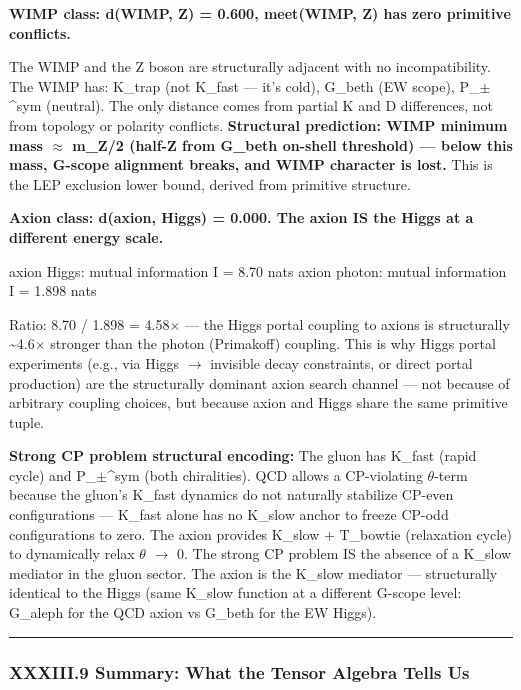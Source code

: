\documentclass[12pt,a4paper]{article}
\begin{document}
\textbf{WIMP class: d(WIMP, Z) = 0.600, meet(WIMP, Z) has zero primitive conflicts.}

The WIMP and the Z boson are structurally adjacent with no incompatibility. The WIMP has: K\_trap (not K\_fast --- it's cold), G\_beth (EW scope), P\_$\pm$\^{}sym (neutral). The only distance comes from partial K and D differences, not from topology or polarity conflicts. \textbf{Structural prediction: WIMP minimum mass $\approx$ m\_Z/2 (half-Z from G\_beth on-shell threshold) --- below this mass, G-scope alignment breaks, and WIMP character is lost.} This is the LEP exclusion lower bound, derived from primitive structure.

\textbf{Axion class: d(axion, Higgs) = 0.000. The axion IS the Higgs at a different energy scale.}

axion \otimes Higgs: mutual information I = 8.70 nats
axion \otimes photon: mutual information I = 1.898 nats

Ratio: 8.70 / 1.898 = 4.58$\times$ --- the Higgs portal coupling to axions is structurally \textasciitilde{}4.6$\times$ stronger than the photon (Primakoff) coupling. This is why Higgs portal experiments (e.g., via Higgs $\rightarrow$ invisible decay constraints, or direct portal production) are the structurally dominant axion search channel --- not because of arbitrary coupling choices, but because axion and Higgs share the same primitive tuple.

\textbf{Strong CP problem structural encoding:} The gluon has K\_fast (rapid cycle) and P\_$\pm$\^{}sym (both chiralities). QCD allows a CP-violating $\theta$-term because the gluon's K\_fast dynamics do not naturally stabilize CP-even configurations --- K\_fast alone has no K\_slow anchor to freeze CP-odd configurations to zero. The axion provides K\_slow + T\_bowtie (relaxation cycle) to dynamically relax $\theta$ $\rightarrow$ 0. The strong CP problem IS the absence of a K\_slow mediator in the gluon sector. The axion is the K\_slow mediator --- structurally identical to the Higgs (same K\_slow function at a different G-scope level: G\_aleph for the QCD axion vs G\_beth for the EW Higgs).

\begin{center}
\rule{0.5\textwidth}{0.4pt}
\end{center}

\subsubsection{XXXIII.9 Summary: What the Tensor Algebra Tells Us}
\end{document}
